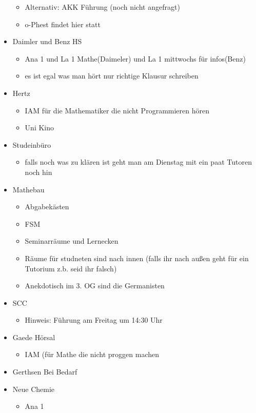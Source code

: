 \documentclass[10pt,twocolumn,ngerman]{scrartcl}
\begin{document}
\begin{itemize}
\begin{itemize}
\item Alternativ: AKK Führung (noch nicht angefragt) 
\item o-Phest findet hier statt
\end{itemize}
\item Daimler und Benz HS
\begin{itemize}
\item Ana 1 und La 1 Mathe(Daimeler) und La 1 mittwochs für infos(Benz)
\item es ist egal was man hört nur richtige Klausur schreiben 
\end{itemize}
\item Hertz
\begin{itemize}
\item IAM für die Mathematiker die nicht Programmieren hören
\item Uni Kino
\end{itemize}
\item Studeinbüro
\begin{itemize}
\item falls noch was zu klären ist geht man am Dienstag mit ein paat Tutoren
noch hin
\end{itemize}
\item Mathebau
\begin{itemize}
\item Abgabekästen
\item FSM 
\item Seminarräume und Lernecken 
\item Räume für studneten sind nach innen (falls ihr nach außen geht für
ein Tutorium z.b. seid ihr falsch)
\item Anekdotisch im 3. OG sind die Germanisten
\end{itemize}
\item SCC
\begin{itemize}
\item Hinweis: Führung am Freitag um 14:30 Uhr
\end{itemize}
\item Gaede Hörsal
\begin{itemize}
\item IAM (für Mathe die nicht proggen machen
\end{itemize}
\item Gerthsen Bei Bedarf
\item Neue Chemie
\begin{itemize}
\item Ana 1
\end{itemize}
\end{itemize}
\end{document}

